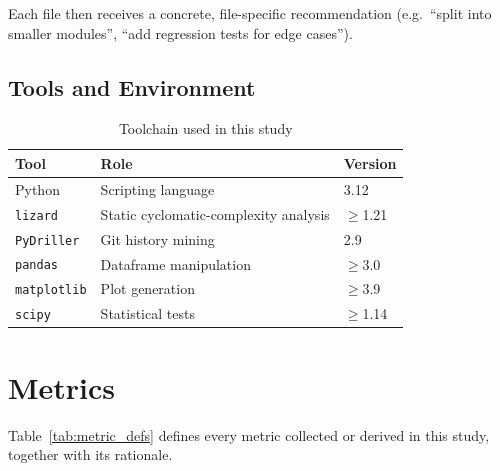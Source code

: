 \documentclass[12pt,a4paper]{article}
\begin{document}
Each file then receives a concrete, file-specific recommendation (e.g.\ ``split into smaller modules'', ``add regression tests for edge cases'').

\subsection{Tools and Environment}

\begin{table}[H]
\centering
\caption{Toolchain used in this study}
\label{tab:tools}
\begin{tabular}{lll}
\toprule
\textbf{Tool}      & \textbf{Role}                        & \textbf{Version} \\
\midrule
Python              & Scripting language                    & 3.12             \\
\texttt{lizard}     & Static cyclomatic-complexity analysis & $\geq$1.21       \\
\texttt{PyDriller}  & Git history mining                    & 2.9              \\
\texttt{pandas}     & Dataframe manipulation                & $\geq$3.0        \\
\texttt{matplotlib} & Plot generation                       & $\geq$3.9        \\
\texttt{scipy}      & Statistical tests                     & $\geq$1.14       \\
\bottomrule
\end{tabular}
\end{table}

\FloatBarrier
\section{Metrics}
\label{sec:metrics}

Table~\ref{tab:metric_defs} defines every metric collected or derived in this study, together with its rationale.
\end{document}
